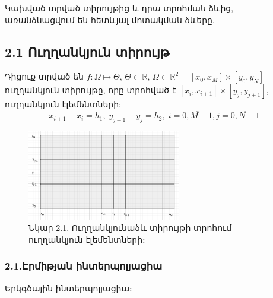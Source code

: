 \documentclass[fleqn, bachelor,subf,12pt,notitlepage]{article}
\begin{document}
Կախված տրված տիրույթից և դրա տրոհման ձևից, առանձնացվում են հետևյալ մոտակման ձևերը.
\subsection*{2.1 Ուղղանկյուն տիրույթ}
Դիցուք տրված են $f:\Omega\mapsto \Theta$,  $\Theta \subset \mathbb{R}$, $\Omega \subset \mathbb{R}^{2} = \left[x_{0}, x_{M}\right] \times \left[y_{0}, y_{N}\right]$  ուղղանկյուն տիրույթը, որը տրոհված է $\left[x_{i}, x_{i+1}\right] \times \left[y_{j}, y_{j+1}\right]$, ուղղանկյուն էլեմենտների:
$$x_{i+1}-x_{i}=h_{1}, \; y_{j+1}-y_{j}=h_{2}, \; i=\overline{0, M-1}, j=\overline{0, N-1}$$
\begin{figure}[h!]
\centering
\includegraphics[width=0.6\textwidth]{images/two_var_linear}
\captionsetup{labelformat=empty}
\caption{Նկար 2.1. Ուղղանկյունաձև տիրույթի տրոհում ուղղանկյուն էլեմենտների։}
\end{figure}
\newpage
\subsubsection*{2.1.Էրմիթյան ինտերպոլյացիա}
Երկգծային ինտերպոլյացիա։
\end{document}
